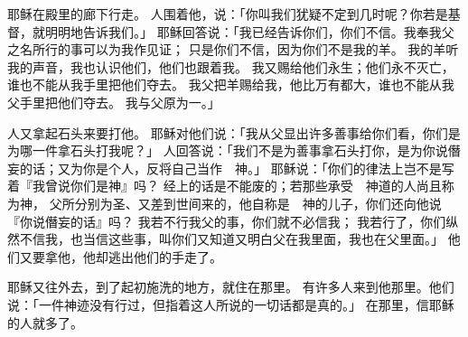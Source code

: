 {耶稣在殿里{}的廊下行走。
人围着他，说：「你叫我们犹疑不定到几时呢？你若是基督，就明明地告诉我们。」
耶稣回答说：「我已经告诉你们，你们不信。我奉我父之名所行的事可以为我作见证；
只是你们不信，因为你们不是我的羊。
我的羊听我的声音，我也认识他们，他们也跟着我。
我又赐给他们永生；他们永不灭亡，谁也不能从我手里把他们夺去。
我父把羊赐给我，他比万有都大，谁也不能从我父手里把他们夺去。
我与父原为一。」
\par }{\PP {}人又拿起石头来要打他。
耶稣对他们说：「我从父显出许多善事给你们看，你们是为哪一件拿石头打我呢？」
人回答说：「我们不是为善事拿石头打你，是为你说僭妄的话；又为你是个人，反将自己当作　神。」
耶稣说：「你们的律法上岂不是写着『我曾说你们是神』吗？
经上的话是不能废的；若那些承受　神道的人尚且称为神，
父所分别为圣、又差到世间来的，他自称是　神的儿子，你们还向他说『你说僭妄的话』吗？
我若不行我父的事，你们就不必信我；
我若行了，你们纵然不信我，也当信这些事，叫你们又知道又明白父在我里面，我也在父里面。」
他们又要拿他，他却逃出他们的手走了。
\par }{\PP {}耶稣又往{}外去，到了{}起初施洗的地方，就住在那里。
有许多人来到他那里。他们说：「{}一件神迹没有行过，但{}指着这人所说的一切话都是真的。」
在那里，信耶稣的人就多了。

}
